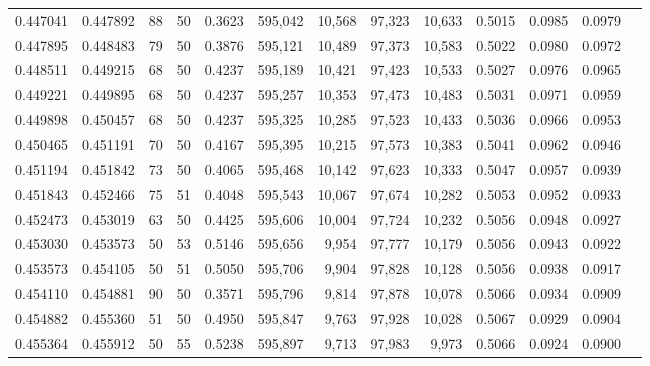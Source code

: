 \begin{tabular}{rrrrrrrrrrrrr}
0.447041 & 0.447892 &    88 &  50 &                                     0.3623 & 595,042 &  10,568 &  97,323 &  10,633 & 0.5015 & 0.0985 & 0.0979 \\
0.447895 & 0.448483 &    79 &  50 &                                     0.3876 & 595,121 &  10,489 &  97,373 &  10,583 & 0.5022 & 0.0980 & 0.0972 \\
0.448511 & 0.449215 &    68 &  50 &                                     0.4237 & 595,189 &  10,421 &  97,423 &  10,533 & 0.5027 & 0.0976 & 0.0965 \\
0.449221 & 0.449895 &    68 &  50 &                                     0.4237 & 595,257 &  10,353 &  97,473 &  10,483 & 0.5031 & 0.0971 & 0.0959 \\
0.449898 & 0.450457 &    68 &  50 &                                     0.4237 & 595,325 &  10,285 &  97,523 &  10,433 & 0.5036 & 0.0966 & 0.0953 \\
0.450465 & 0.451191 &    70 &  50 &                                     0.4167 & 595,395 &  10,215 &  97,573 &  10,383 & 0.5041 & 0.0962 & 0.0946 \\
0.451194 & 0.451842 &    73 &  50 &                                     0.4065 & 595,468 &  10,142 &  97,623 &  10,333 & 0.5047 & 0.0957 & 0.0939 \\
0.451843 & 0.452466 &    75 &  51 &                                     0.4048 & 595,543 &  10,067 &  97,674 &  10,282 & 0.5053 & 0.0952 & 0.0933 \\
0.452473 & 0.453019 &    63 &  50 &                                     0.4425 & 595,606 &  10,004 &  97,724 &  10,232 & 0.5056 & 0.0948 & 0.0927 \\
0.453030 & 0.453573 &    50 &  53 &                                     0.5146 & 595,656 &   9,954 &  97,777 &  10,179 & 0.5056 & 0.0943 & 0.0922 \\
0.453573 & 0.454105 &    50 &  51 &                                     0.5050 & 595,706 &   9,904 &  97,828 &  10,128 & 0.5056 & 0.0938 & 0.0917 \\
0.454110 & 0.454881 &    90 &  50 &                                     0.3571 & 595,796 &   9,814 &  97,878 &  10,078 & 0.5066 & 0.0934 & 0.0909 \\
0.454882 & 0.455360 &    51 &  50 &                                     0.4950 & 595,847 &   9,763 &  97,928 &  10,028 & 0.5067 & 0.0929 & 0.0904 \\
0.455364 & 0.455912 &    50 &  55 &                                     0.5238 & 595,897 &   9,713 &  97,983 &   9,973 & 0.5066 & 0.0924 & 0.0900 \\

\end{tabular}
